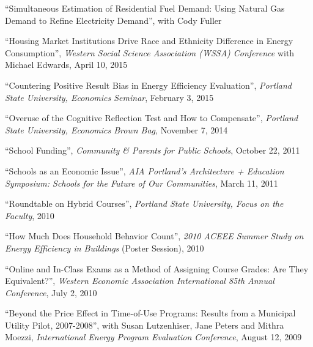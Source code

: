 \documentclass[Computer Science]{vita}
\begin{document}
\begin{vita}
\begin{Publications}
\begin{Work in progress}
\item ``Simultaneous Estimation of Residential Fuel Demand: Using Natural Gas Demand to Refine Electricity Demand'', with Cody Fuller


 



    \end{Work in progress}

  \end{Publications}

  \begin{Presentations and Invited Talks}
  
  \item \item ``Housing Market Institutions Drive Race and Ethnicity Difference in Energy Consumption'', \emph{Western Social Science Association (WSSA) Conference} with Michael Edwards, April 10, 2015
  
  \item ``Countering Positive Result Bias in Energy Efficiency Evaluation'', \emph{Portland State University, Economics Seminar}, February 3, 2015
  
  
  \item ``Overuse of the Cognitive Reflection Test and How to Compensate'', \emph{Portland State University, Economics Brown Bag}, November 7, 2014
   
  
  \item ``School Funding'', \emph{Community \& Parents for Public Schools}, October 22, 2011
  
\item ``Schools as an Economic Issue'', \emph{AIA Portland's Architecture + Education Symposium: Schools for the Future of Our Communities}, March 11, 2011

\item ``Roundtable on Hybrid Courses'', \emph{Portland State University, Focus on the Faculty}, 2010

  \item ``How Much Does Household Behavior Count'', \emph{2010 ACEEE
      Summer Study on Energy Efficiency in Buildings} (Poster
    Session), 2010
	  
  \item ``Online and In-Class Exams as a Method of Assigning Course
    Grades: Are They Equivalent?'', \emph{Western Economic Association
      International 85th Annual Conference}, July 2, 2010

  \item ``Beyond the Price Effect in Time-of-Use Programs: Results
    from a Municipal Utility Pilot, 2007-2008'', with Susan
    Lutzenhiser, Jane Peters and Mithra Moezzi, \emph{International
      Energy Program Evaluation Conference}, August 12, 2009


\end{Presentations and Invited Talks}
\end{vita}
\end{document}
